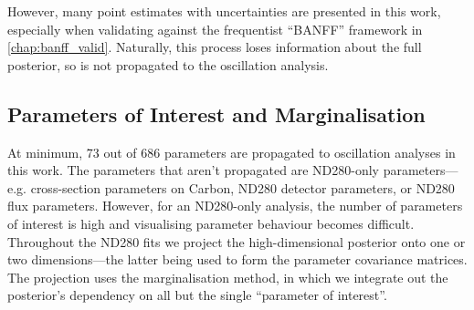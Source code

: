 However, many point estimates with uncertainties are presented in this work, especially when validating against the frequentist ``BANFF'' framework in \autoref{chap:banff_valid}. Naturally, this process loses information about the full posterior, so is not propagated to the oscillation analysis.
 
\subsection{Parameters of Interest and Marginalisation}
At minimum, 73 out of 686 parameters are propagated to oscillation analyses in this work. The parameters that aren't propagated are ND280-only parameters---e.g. cross-section parameters on Carbon, ND280 detector parameters, or ND280 flux parameters. However, for an ND280-only analysis, the number of parameters of interest is high and visualising parameter behaviour becomes difficult. Throughout the ND280 fits we project the high-dimensional posterior onto one or two dimensions---the latter being used to form the parameter covariance matrices. The projection uses the marginalisation method, in which we integrate out the posterior's dependency on all but the single ``parameter of interest''. 


